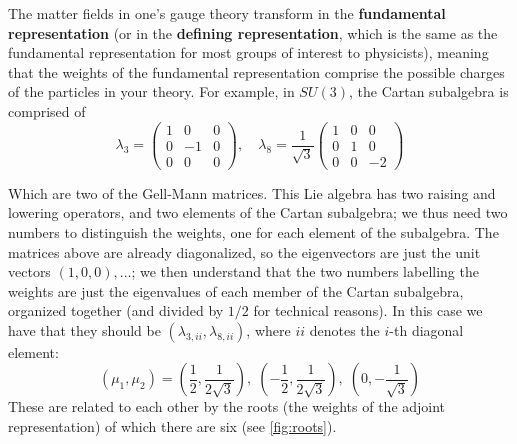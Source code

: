 \documentclass{report}
\begin{document}
 The matter fields in one's gauge theory transform in the
\textbf{fundamental representation} (or in the \textbf{defining representation},
which is the same as the fundamental representation for most groups of interest
to physicists), meaning that the weights of the fundamental representation 
comprise the possible charges of the particles in your theory. For example, in $
SU(3) $, the Cartan subalgebra is comprised of 
\begin{equation*}
	\lambda_3 = \begin{pmatrix}
	1 & 0 & 0 \\ 0 &-1 & 0 \\ 0& 0 & 0
	\end{pmatrix},\quad 
	\lambda_8 = \frac{1}{\sqrt{3}}\begin{pmatrix}
	1 & 0 & 0 \\ 0 &1 & 0 \\ 0& 0 & -2
	\end{pmatrix}
\end{equation*}

Which are two of the Gell-Mann matrices. This Lie algebra has two raising and 
lowering operators, and two elements of the Cartan subalgebra; we thus need 
two numbers to distinguish the weights, one for each element of the subalgebra.  
The matrices above are already diagonalized, so the eigenvectors are just the 
unit vectors $ \left(1,0,0\right), \dots $; we then understand that the two 
numbers labelling the weights are just the eigenvalues of each member of the 
Cartan subalgebra, organized together (and divided by $ 1/2 $ for technical 
reasons). In this case we have that they should be $ (\lambda_{3,ii}, \lambda_{8,ii}) $, 
where $ ii $ denotes the $ i $-th diagonal element:
\begin{equation*}
	(\mu_1, \mu_2) = \left(\frac{1}{2}, \frac{1}{2\sqrt{3}}\right), 
	\; \left(-\frac{1}{2}, \frac{1}{2\sqrt{3}}\right), 
	\; \left(0, - \frac{1}{\sqrt{3}}\right)
\end{equation*}
These are related to each other by the roots (the weights of the adjoint representation)
of which there are six (see \cref{fig:roots}).
\end{document}

